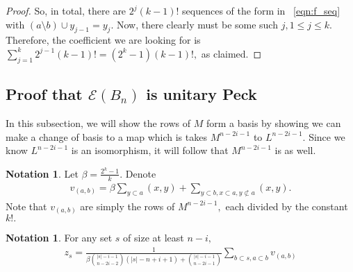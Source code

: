 \documentclass[10 pt]{amsart}
\theoremstyle{plain}
\theoremstyle{definition}
\newtheorem{note}[thm]{Notation}
\theoremstyle{remark}
\numberwithin{equation}{section}
\newcommand\ssec{\subsection}
\begin{document}
\begin{proof}
So, in total, there are $2^j(k-1)!$ sequences of the form in ~\eqref{eqn:f_seq} with $(a\setminus b) \cup y_{j-1} = y_j$. Now, there clearly must be some such $j,1 \leq j \leq k.$ Therefore, the coefficient we are looking for is $\sum_{j = 1}^k 2^{j-1}(k-1)! = (2^k - 1)(k-1)!,$ as claimed.

\end{proof}



\ssec{Proof that $\mathcal E(B_n)$ is unitary Peck}

In this subsection, we will show the rows of $M$ form a basis by showing we can make a change of basis to a map which is takes $M^{n-2i-1}$ to $L^{n-2i-1}.$ Since we know $L^{n-2i-1}$ is an isomorphism, it will follow that $M^{n-2i-1}$ is as well.

\begin{note}

Let $\beta = \frac{2^k-1}{k}.$ Denote 
\begin{align*}
	v_{(a, b)} =\beta \sum_{y \subset a}^{}(x, y) + \sum_{y\subset b,x \subset a,y\not\subset a}^{}(x, y).
\end{align*}
Note that $v_{(a, b)}$ are simply the rows of $M^{n-2i-1},$ each divided by the constant $k!.$
\end{note}

\begin{note}
For any set $s$ of size at least $n-i,$
\begin{align*}
	z_s = \frac{1}{\beta\binom {|s|-i-1}{n-2i-2}(|s|-n+i+1)+\binom{|s|-i-1}{n-2i-1}} \sum_{b\subset s,a \subset b}^{}v_{(a, b)}
\end{align*}
\end{note}
\end{document}
